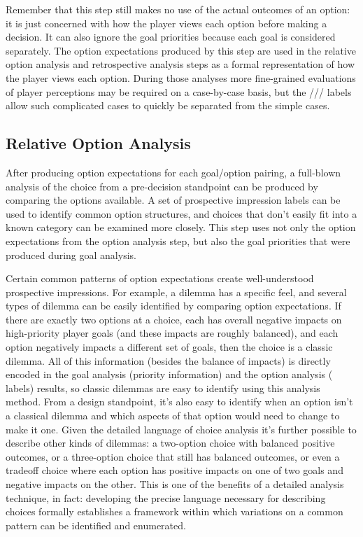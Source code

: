 Remember that this step still makes no use of the actual outcomes of an option: it is just concerned with how the player views each option before making a decision.
%
It can also ignore the goal priorities because each goal is considered separately.
%
The option expectations produced by this step are used in the relative option analysis and retrospective analysis steps as a formal representation of how the player views each option.
%
During those analyses more fine-grained evaluations of player perceptions may be required on a case-by-case basis, but the /// labels allow such complicated cases to quickly be separated from the simple cases.


\subsection{Relative Option Analysis}

\label{sec:cp-relative-option-analysis}

After producing option expectations for each goal/option pairing, a full-blown analysis of the choice from a pre-decision standpoint can be produced by comparing the options available.
%
A set of prospective impression labels can be used to identify common option structures, and choices that don't easily fit into a known category can be examined more closely.
%
This step uses not only the option expectations from the option analysis step, but also the goal priorities that were produced during goal analysis.


Certain common patterns of option expectations create well-understood prospective impressions.
%
For example, a dilemma has a specific feel, and several types of dilemma can be easily identified by comparing option expectations.
%
If there are exactly two options at a choice, each has overall negative impacts on high-priority player goals (and these impacts are roughly balanced), and each option negatively impacts a different set of goals, then the choice is a classic dilemma.
%
All of this information (besides the balance of impacts) is directly encoded in the goal analysis (priority information) and the option analysis ( labels) results, so classic dilemmas are easy to identify using this analysis method.
%
From a design standpoint, it's also easy to identify when an option isn't a classical dilemma and which aspects of that option would need to change to make it one.
%
Given the detailed language of choice analysis it's further possible to describe other kinds of dilemmas: a two-option choice with balanced positive outcomes, or a three-option choice that still has balanced outcomes, or even a tradeoff choice where each option has positive impacts on one of two goals and negative impacts on the other.
%
This is one of the benefits of a detailed analysis technique, in fact: developing the precise language necessary for describing choices formally establishes a framework within which variations on a common pattern can be identified and enumerated.



